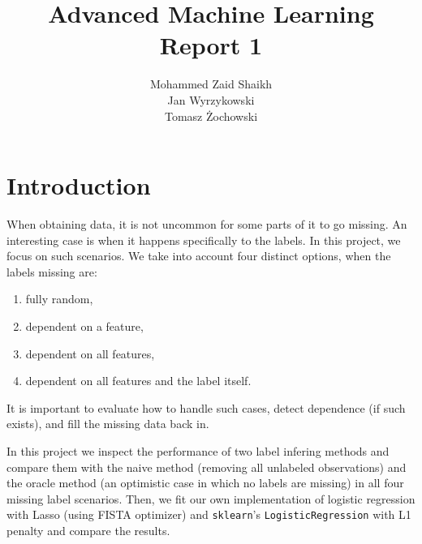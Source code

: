 \documentclass{article}
\title{Advanced Machine Learning\\Report 1}
\author{Mohammed Zaid Shaikh\\Jan Wyrzykowski\\Tomasz Żochowski}
\begin{document}
\maketitle
\tableofcontents
\newpage

\section{Introduction}




When obtaining data, it is not uncommon for some parts of it to go missing. An interesting case is when it happens specifically to the labels. In this project, we focus on such scenarios. We take into account four distinct options, when the labels missing are:

\begin{enumerate}
    \item fully random,
    \item dependent on a feature,
    \item dependent on all features,
    \item dependent on all features and the label itself.
\end{enumerate}

It is important to evaluate how to handle such cases, detect dependence (if such exists), and fill the missing data back in. 

In this project we inspect the performance of two label infering methods and compare them with the naive method (removing all unlabeled observations) and the oracle method (an optimistic case in which no labels are missing) in all four missing label scenarios. Then, we fit our own implementation of logistic regression with Lasso (using FISTA optimizer) and \verb|sklearn|'s \verb|LogisticRegression| with L1 penalty and compare the results.
\end{document}
